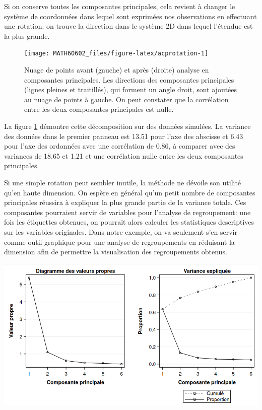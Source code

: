 \documentclass[
  11pt,
  letterpaper,
]{book}
\theoremstyle{definition}
\theoremstyle{definition}
\theoremstyle{definition}
\theoremstyle{definition}
\theoremstyle{remark}
\begin{document}
Si on conserve toutes les composantes principales, cela revient à changer le système de coordonnées dans lequel sont exprimées nos observations en effectuant une rotation: on trouve la direction dans le système 2D dans lequel l'étendue est la plus grande.

\begin{figure}

{\centering \texttt{[image: MATH60602\_files/figure-latex/acprotation-1]} 

}

\caption{Nuage de points avant (gauche) et après (droite) analyse en composantes principales. Les directions des composantes principales (lignes pleines et traitillés), qui forment un angle droit, sont ajoutées au nuage de points à gauche. On peut constater que la corrélation entre les deux composantes principales est nulle.}\label{fig:acprotation}
\end{figure}

La figure \ref{fig:acprotation} démontre cette décomposition sur des données simulées. La variance des données dans le premier panneau est 13.51 pour l'axe des abscisse et 6.43 pour l'axe des ordonnées avec une corrélation de 0.86, à comparer avec des variances de 18.65 et 1.21 et une corrélation nulle entre les deux composantes principales.

Si une simple rotation peut sembler inutile, la méthode ne dévoile son utilité qu'en haute dimension. On espère en général qu'un petit nombre de composantes principales réussira à expliquer la plus grande partie de la variance totale. Ces composantes pourraient servir de variables pour l'analyse de regroupement: une fois les étiquettes obtenues, on pourrait alors calculer les statistiques descriptives sur les variables originales. Dans notre exemple, on va seulement s'en servir comme outil graphique pour une analyse de regroupements en réduisant la dimension afin de permettre la visualisation des regroupements obtenus.

\begin{center}\includegraphics[width=0.8\linewidth]{figures/04-clustering-e18} \end{center}
\end{document}
